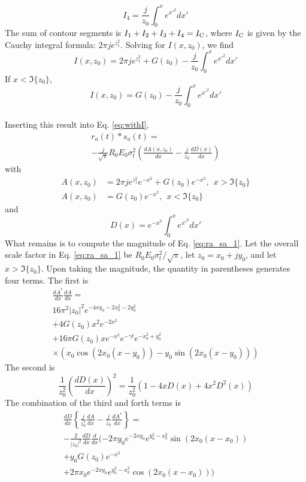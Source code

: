 \documentclass[amsmath,amssymb,aps,prd,10pt,twocolumn,showkeys]{revtex4}
\begin{document}
\begin{itemize}
\begin{equation}
I_4 = \frac{j}{z_0}\int_{0}^{x} e^{x'^2} dx'
\end{equation}
The sum of contour segments is $I_1 + I_2 + I_3 + I_4 = I_{\rm C}$, where $I_{\rm C}$ is given by the Cauchy integral formula: $2\pi j e^{z_1^2}$.  Solving for $I(x,z_0)$, we find
\begin{equation}
I(x,z_0) = 2\pi j e^{z_1^2} + G(z_0) - \frac{j}{z_0}\int_{0}^{x} e^{x'^2} dx'
\end{equation}
If $x < \Im\lbrace z_0\rbrace$,
\begin{equation}
I(x,z_0) = G(z_0) - \frac{j}{z_0}\int_{0}^{x} e^{x'^2} dx'
\end{equation} \\
Inserting this result into Eq. \ref{eq:withI},
\begin{multline}
r_a(t) * s_a(t) = \\ -\frac{j}{\sqrt{\pi}} R_0 E_0 \sigma_t^2 \left(\frac{dA(x,z_0)}{dx}-\frac{j}{z_0}\frac{dD(x)}{dx} \right) \label{eq:ra_sa_1}
\end{multline}
with
\begin{align}
A(x,z_0) &= 2\pi j e^{z_1^2} e^{-x^2} + G(z_0)e^{-x^2}, ~~ x > \Im \lbrace z_0 \rbrace\\
A(x,z_0) &= G(z_0)e^{-x^2}, ~~ x < \Im \lbrace z_0 \rbrace
\end{align}
and
\begin{equation}
D(x) = e^{-x^2} \int_{0}^{x} e^{x'^2} dx'
\end{equation}
What remains is to compute the magnitude of Eq. \ref{eq:ra_sa_1}.  Let the overall scale factor in Eq. \ref{eq:ra_sa_1} be $R_0 E_0 \sigma_t^2/\sqrt{\pi}$, let $z_0 = x_0 + j y_0$, and let $x>\Im\lbrace z_0\rbrace$.  Upon taking the magnitude, the quantity in parentheses generates four terms.  The first is
\begin{multline}
\frac{dA^{*}}{dx}\frac{dA}{dx} = \\ 16\pi^2|z_0|^2 e^{-4x y_0 - 2x_0^2-2y_0^2} \\ + 4G(z_0)x^2 e^{-2x^2} \\ + 16\pi G(z_0) x e^{-x^2}e^{-\gamma t} e^{-x_0^2+y_0^2} \\ \times \left(x_0\cos(2x_0(x-y_0)) - y_0\sin(2x_0(x-y_0)) \right)
\end{multline}
The second is
\begin{equation}
\frac{1}{z_0^2}\left(\frac{dD(x)}{dx}\right)^2 = \frac{1}{z_0^2}\left(1-4xD(x)+4x^2D^2(x) \right)
\end{equation}
The combination of the third and forth terms is
\begin{multline}
\frac{dD}{dx}\left\lbrace \frac{j}{z_0^{*}} \frac{dA}{dx} - \frac{j}{z_0} \frac{dA^{*}}{dx}\right\rbrace = \\
-\frac{2}{|z_0|^2} \frac{dD}{dx}\frac{d}{dx} ( -2\pi y_0 e^{-2xy_0} e^{y_0^2-x_0^2}\sin(2x_0(x-x_0)) \\
+ y_0G(z_0)e^{-x^2} \\
+ 2\pi x_0 e^{-2xy_0} e^{y_0^2-x_0^2}\cos(2x_0(x-x_0)) )
\end{multline}
\end{itemize}
\end{document}
